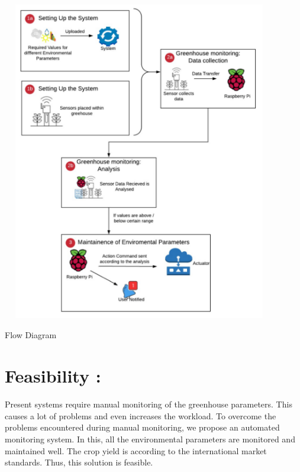\documentclass[12pt]{extarticle}
\begin{document}
    \begin{center}
        \includegraphics[width=12cm,height=14cm]{FlowDiagram.png}
    \end{center}
    \begin{center}
        Flow Diagram
    \end{center}
\section{Feasibility : }
\paragraph{}
Present systems require manual monitoring of the greenhouse parameters. This causes a lot of problems and even increases the workload. To overcome the problems encountered during manual monitoring, we propose an automated monitoring system. In this, all the environmental parameters are monitored and maintained well. The crop yield is according to the international market standards. Thus, this solution is feasible.
\end{document}
